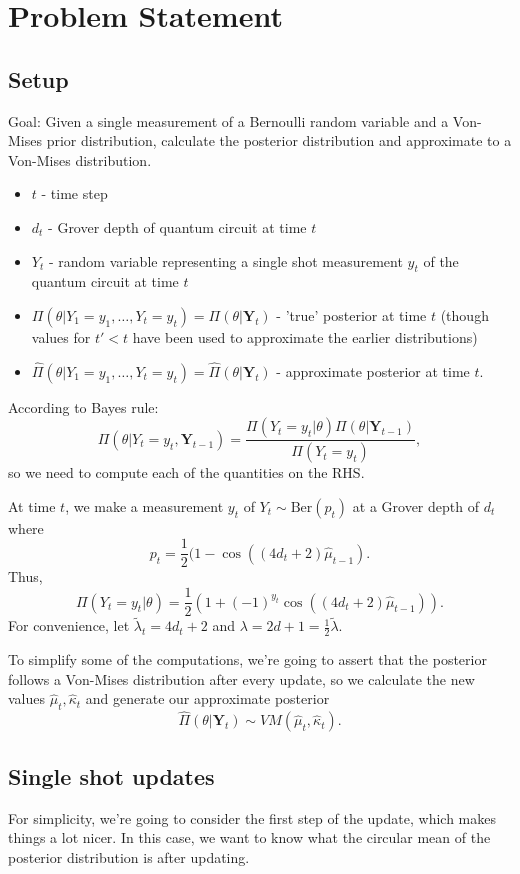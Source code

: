 \documentclass[]{report}
\begin{document}
\chapter{Problem Statement}
\section{Setup}
Goal: Given a single measurement of a Bernoulli random variable and a Von-Mises prior distribution, calculate the posterior distribution and approximate to a Von-Mises distribution.

\begin{itemize}
	\item $t$ - time step
	\item $d_t$ - Grover depth of quantum circuit at time $t$
	\item $Y_t$ - random variable representing a single shot measurement $y_t$ of the quantum circuit at time $t$
	\item $\Pi(\theta| Y_1 = y_1, \ldots, Y_t = y_t) = \Pi(\theta | \mathbf{Y}_t )$ - 'true' posterior at time $t$ (though values for $t ' < t$ have been used to approximate the earlier distributions)
	\item  $\hat{\Pi}(\theta| Y_1 = y_1, \ldots, Y_t = y_t) = \hat{\Pi}(\theta | \mathbf{Y}_t )$ - approximate posterior at time $t$.
\end{itemize}

According to Bayes rule:
\[
\Pi (\theta | Y_t = y_t, \mathbf{Y}_{t -1}) = \frac{\Pi(Y_t = y_t | \theta) \Pi(\theta | \mathbf{Y}_{t-1})}{\Pi(Y_t = y_t) },
\]
so we need to compute each of the quantities on the RHS.

At time $t$, we make a measurement $y_t$ of $Y_t \sim \text{Ber}(p_t)$ at a Grover depth of $d_t$ where
\[
	p_t = \frac{1}{2}(1 - \cos((4d_t + 2) \hat{\mu}_{t-1}).
\]
Thus,
\[
\Pi(Y_t = y_t | \theta) =  \frac{1}{2}(1 + (-1)^{y_t} \cos((4d_t + 2) \hat{\mu}_{t-1})).
\]
For convenience, let $\tilde{\lambda}_t = 4d_t + 2$ and $\lambda = 2d + 1 = \frac{1}{2}\tilde{\lambda}$.

To simplify some of the computations, we're going to assert that the posterior follows a Von-Mises distribution after every update, so we calculate the new values $\hat{\mu}_t, \hat{\kappa}_t$ and generate our approximate posterior
\[
\hat{\Pi}(\theta | \mathbf{Y}_t )  \sim VM(\hat{\mu}_t, \hat{\kappa}_t).
\]
\section{Single shot updates}
For simplicity, we're going to consider the first step of the update, which makes things a lot nicer. In this case, we want to know what the circular mean of the posterior distribution is after updating.
\end{document}
